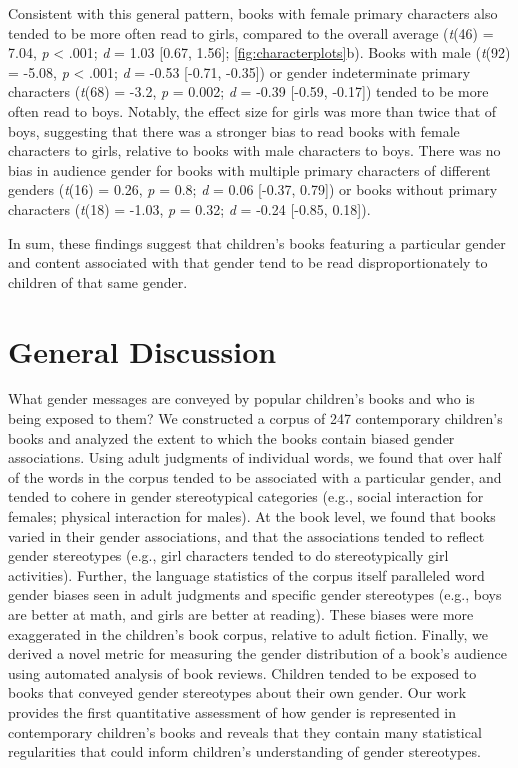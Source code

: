 \documentclass[
  english,
  ,man,floatsintext]{apa6}
\begin{document}
Consistent with this general pattern, books with female primary characters also tended to be more often read to girls, compared to the overall average (\emph{t}(46) = 7.04, \emph{p} \textless{} .001; \emph{d} = 1.03 {[}0.67, 1.56{]}; \autoref{fig:characterplots}b). Books with male (\emph{t}(92) = -5.08, \emph{p} \textless{} .001; \emph{d} = -0.53 {[}-0.71, -0.35{]}) or gender indeterminate primary characters (\emph{t}(68) = -3.2, \emph{p} = 0.002; \emph{d} = -0.39 {[}-0.59, -0.17{]}) tended to be more often read to boys. Notably, the effect size for girls was more than twice that of boys, suggesting that there was a stronger bias to read books with female characters to girls, relative to books with male characters to boys. There was no bias in audience gender for books with multiple primary characters of different genders (\emph{t}(16) = 0.26, \emph{p} = 0.8; \emph{d} = 0.06 {[}-0.37, 0.79{]}) or books without primary characters (\emph{t}(18) = -1.03, \emph{p} = 0.32; \emph{d} = -0.24 {[}-0.85, 0.18{]}).

In sum, these findings suggest that children's books featuring a particular gender and content associated with that gender tend to be read disproportionately to children of that same gender.

\hypertarget{general-discussion}{%
\section{General Discussion}\label{general-discussion}}

What gender messages are conveyed by popular children's books and who is being exposed to them? We constructed a corpus of 247 contemporary children's books and analyzed the extent to which the books contain biased gender associations. Using adult judgments of individual words, we found that over half of the words in the corpus tended to be associated with a particular gender, and tended to cohere in gender stereotypical categories (e.g., social interaction for females; physical interaction for males). At the book level, we found that books varied in their gender associations, and that the associations tended to reflect gender stereotypes (e.g., girl characters tended to do stereotypically girl activities). Further, the language statistics of the corpus itself paralleled word gender biases seen in adult judgments and specific gender stereotypes (e.g., boys are better at math, and girls are better at reading). These biases were more exaggerated in the children's book corpus, relative to adult fiction. Finally, we derived a novel metric for measuring the gender distribution of a book's audience using automated analysis of book reviews. Children tended to be exposed to books that conveyed gender stereotypes about their own gender. Our work provides the first quantitative assessment of how gender is represented in contemporary children's books and reveals that they contain many statistical regularities that could inform children's understanding of gender stereotypes.
\end{document}
